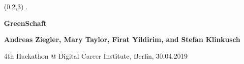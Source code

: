 \begin{textblock}{27}(0.2,3)
{\white .}

\vspace{1mm}

\begin{center}
{\Huge \bf \sf \color{dgreen} GreenSchaft}

\vspace{30mm}

{\LARGE \bf Andreas Ziegler, Mary Taylor, Firat Yildirim, and Stefan Klinkusch}

\vspace{20mm}

{\large 4th Hackathon @ Digital Career Institute, Berlin, 30.04.2019}

\vspace{10mm}


\end{center}

\end{textblock}

\ \newpage
